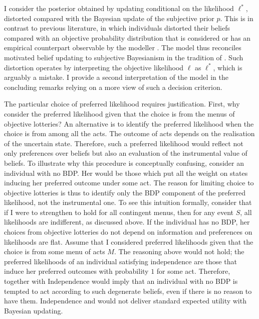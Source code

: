 I consider the posterior obtained by updating conditional on the likelihood \( \ell^{*} \), distorted compared with the Bayesian update of the subjective prior \( p \). This is in contrast to previous literature, in which individuals distorted their beliefs compared with an objective probability distribution that is considered  or has an empirical counterpart observable by the modeller \citep{brunnermeierOptimalExpectations2005,yarivLlSeeIt2002}. The model thus reconciles motivated belief updating to subjective Bayesianism in the tradition of \cite{savageFoundationsStatistics1972}. Such distortion operates by interpreting the objective likelihood \( \ell \) as \( \ell^{*} \), which is arguably a mistake. I provide a second interpretation of the model in the concluding remarks relying on a more  view of such a decision criterion.

The particular choice of preferred likelihood requires justification. First, why consider the preferred likelihood given that the choice is from the menus of objective lotteries? An alternative is to identify the preferred likelihood when the choice is from among all the acts. The outcome of acts depends on the realisation of the uncertain state. Therefore, such a preferred likelihood would reflect not only preferences over beliefs but also an evaluation of the instrumental value of beliefs. To illustrate why this procedure is conceptually confusing, consider an individual with no BDP. Her  would be those which put all the weight on states inducing her preferred outcome under some act. The reason for limiting choice to objective lotteries is thus to identify only the BDP component of the preferred likelihood, not the instrumental one. To see this intuition formally, consider that if I were to strengthen  to hold for all contingent menus, then for any event \( S \), all likelihoods are indifferent, as discussed above. If the individual has no BDP, her choices from objective lotteries do not depend on information and preferences on likelihoods are flat. Assume that I considered preferred likelihoods given that the choice is from some menu of acts \( M \). The reasoning above would not hold; the preferred likelihoods of an individual satisfying independence are those that induce her preferred outcomes with probability \( 1 \) for some act. Therefore,  together with Independence would imply that an individual with no BDP is tempted to act according to such degenerate beliefs, even if there is no reason to have them. Independence and  would not deliver standard expected utility with Bayesian updating.

